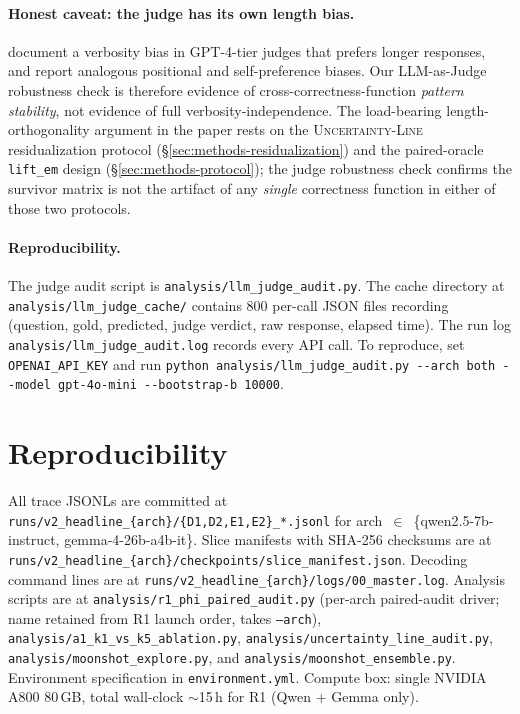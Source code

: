 \documentclass[11pt]{article}
\begin{document}
\paragraph{Honest caveat: the judge has its own length bias.}
\cite{Zheng_LLMasaJudge} document a verbosity bias in GPT-4-tier judges
that prefers longer responses, and \cite{Wang_NotFairEvaluators}
report analogous positional and self-preference biases. Our LLM-as-Judge
robustness check is therefore evidence of cross-correctness-function
\emph{pattern stability}, not evidence of full verbosity-independence. The
load-bearing length-orthogonality argument in the paper rests on the
\textsc{Uncertainty-Line} residualization protocol
(\S\ref{sec:methods-residualization}) and the paired-oracle
\texttt{lift\_em} design (\S\ref{sec:methods-protocol}); the judge
robustness check confirms the survivor matrix is not the artifact of any
\emph{single} correctness function in either of those two protocols.

\paragraph{Reproducibility.}
The judge audit script is
\texttt{analysis/llm\_judge\_audit.py}. The cache directory at
\texttt{analysis/llm\_judge\_cache/} contains 800 per-call JSON files
recording (question, gold, predicted, judge verdict, raw response,
elapsed time). The run log
\texttt{analysis/llm\_judge\_audit.log} records every API call. To
reproduce, set \texttt{OPENAI\_API\_KEY} and run
\verb|python analysis/llm_judge_audit.py --arch both --model gpt-4o-mini --bootstrap-b 10000|.

\section{Reproducibility}
\label{sec:appendix-repro}

All trace JSONLs are committed at
\texttt{runs/v2\_headline\_\{arch\}/\{D1,D2,E1,E2\}\_*.jsonl} for
arch~$\in$~\{qwen2.5-7b-instruct, gemma-4-26b-a4b-it\}. Slice
manifests with SHA-256 checksums are at
\texttt{runs/v2\_headline\_\{arch\}/checkpoints/slice\_manifest.json}.
Decoding command lines are at
\texttt{runs/v2\_headline\_\{arch\}/logs/00\_master.log}. Analysis scripts
are at \texttt{analysis/r1\_phi\_paired\_audit.py} (per-arch paired-audit
driver; name retained from R1 launch order, takes \texttt{--arch}),
\texttt{analysis/a1\_k1\_vs\_k5\_ablation.py},
\texttt{analysis/uncertainty\_line\_audit.py},
\texttt{analysis/moonshot\_explore.py}, and
\texttt{analysis/moonshot\_ensemble.py}.
Environment specification in \texttt{environment.yml}. Compute box: single
NVIDIA A800 80\,GB, total wall-clock $\sim$15\,h for R1 (Qwen + Gemma only).
\end{document}
